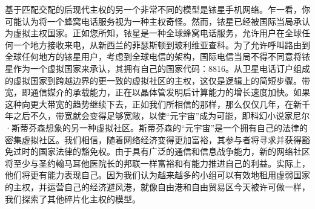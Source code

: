 \begin{paracol}{2}[]
\switchcolumn*
基于匹配交配的后现代主权的另一个非常不同的模型是铱星手机网络。乍一看，你可能认为将一个蜂窝电话服务视为一种主权奇怪。然而，铱星已经被国际当局承认为虚拟主权国家。正如您所知，铱星是一种全球蜂窝电话服务，允许用户在全球任何一个地方接收来电，从新西兰的菲瑟斯顿到玻利维亚查科。为了允许呼叫路由到全球任何地方的铱星用户，考虑到全球电信的架构，国际电信当局不得不同意将铱星作为一个虚拟国家来承认，其拥有自己的国家代码：8816。从卫星电话订户组成的虚拟国家到跨越边界的更一致的虚拟社区的主权，这仅是逻辑上的简短步骤。带宽，即通信媒介的承载能力，正在以晶体管发明后计算能力的增长速度加快。如果这种向更大带宽的趋势继续下去，正如我们所相信的那样，那么仅仅几年，在新千年之后不久，带宽就会变得足够宽敞，以使“元宇宙”成为可能，即科幻小说家尼尔·斯蒂芬森想象的另一种虚拟社区。斯蒂芬森的“元宇宙”是一个拥有自己的法律的密集虚拟社区。我们相信，随着网络经济变得更加富裕，其参与者将寻求并获得豁免过时的国家法律的豁免权。由于具有广泛的通信和信息战争能力，新的网络社区将至少与圣约翰马耳他医院长的邦联一样富裕和有能力推进自己的利益。实际上，他们将更有能力表现自己。因为我们认为越来越多的小组可以有效地租用虚弱国家的主权，并运营自己的经济避风港，就像自由港和自由贸易区今天被许可做一样，我们探索了其他碎片化主权的模型。


\end{paracol}
